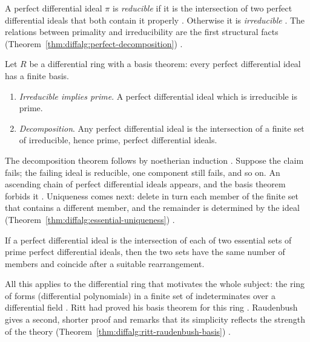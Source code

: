 A perfect differential ideal $\pi$ is \emph{reducible} if it is the
intersection of two perfect differential ideals that both contain it
properly \cite[p.~365]{Raudenbush1934}. Otherwise it is
\emph{irreducible} \cite[p.~365]{Raudenbush1934}. The relations between
primality and irreducibility are the first structural facts (Theorem~\ref{thm:diffalg:perfect-decomposition})
\cite[p.~365]{Raudenbush1934}.\begin{theorem}\label{thm:diffalg:perfect-decomposition}
Let $R$ be a differential ring with a basis theorem: every perfect
differential ideal has a finite basis.

\begin{enumerate}
\item \emph{Irreducible implies prime}. A perfect differential ideal
  which is irreducible is prime.
\item \emph{Decomposition}. Any perfect differential ideal is the
  intersection of a finite set of irreducible, hence prime, perfect
  differential ideals.
\end{enumerate}
\end{theorem}

The decomposition theorem follows by noetherian induction
\cite[p.~365]{Raudenbush1934}. Suppose the claim fails; the failing
ideal is reducible, one component still fails, and so on. An ascending
chain of perfect differential ideals appears, and the basis theorem
forbids it \cite[p.~365]{Raudenbush1934}. Uniqueness comes next: delete
in turn each member of the finite set that contains a different member,
and the remainder is determined by the ideal (Theorem~\ref{thm:diffalg:essential-uniqueness})
\cite[pp.~365--366]{Raudenbush1934}.\begin{theorem}\label{thm:diffalg:essential-uniqueness}
If a perfect differential ideal is the intersection of each of two
essential sets of prime perfect differential ideals, then the two sets
have the same number of members and coincide after a suitable
rearrangement.
\end{theorem}

All this applies to the differential ring that motivates the whole subject:
the ring of forms (differential polynomials) in a finite set of indeterminates
over a differential field \cite[p.~361]{Raudenbush1934}. Ritt had proved his
basis theorem for this ring \cite[p.~361]{Raudenbush1934}. Raudenbush gives a
second, shorter proof and remarks that its simplicity reflects the strength of
the theory (Theorem~\ref{thm:diffalg:ritt-raudenbush-basis})
\cite[p.~362]{Raudenbush1934}.

